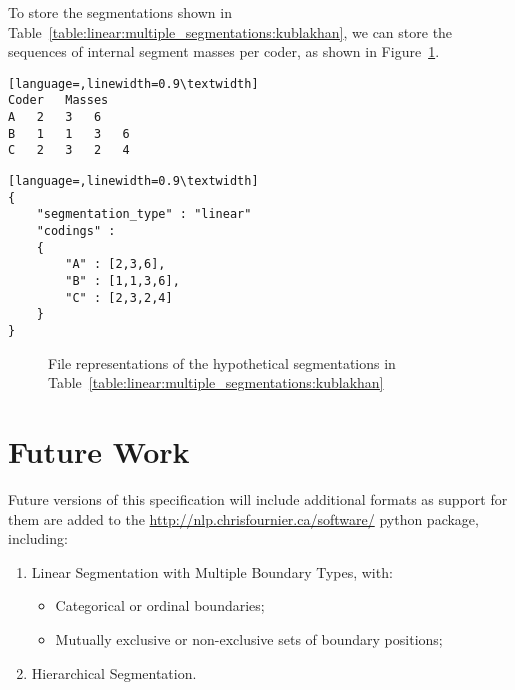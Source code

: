 \documentclass{article}
\begin{document}
To store the segmentations shown in
Table~\ref{table:linear:multiple_segmentations:kublakhan}, we can store the
sequences of internal segment masses per coder, as shown in
Figure~\ref{fig:linear:segmentation:files}.

\newsavebox{\lineartsv}
\begin{lrbox}{\lineartsv}
\begin{minipage}[b]{0.5\textwidth}
\begin{lstlisting}[language=,linewidth=0.9\textwidth]
Coder	Masses
A	2	3	6
B	1	1	3	6
C	2	3	2	4

\end{lstlisting}
\vspace{-2em}
\end{minipage}
\end{lrbox}

\newsavebox{\linearjson}
\begin{lrbox}{\linearjson}
\begin{minipage}[b]{0.5\textwidth}
\begin{lstlisting}[language=,linewidth=0.9\textwidth]
{
	"segmentation_type" : "linear"
	"codings" :
	{
		"A" : [2,3,6],
		"B" : [1,1,3,6],
		"C" : [2,3,2,4]
	}
}
\end{lstlisting}
\vspace{-2em}
\end{minipage}
\end{lrbox}

\begin{figure}[h]
\hspace{1em}
\subfloat[TSV]{\usebox{\lineartsv}}
\subfloat[JSON]{\usebox{\linearjson}}
\caption{File representations of the hypothetical segmentations in Table~\ref{table:linear:multiple_segmentations:kublakhan}}
\label{fig:linear:segmentation:files}
\end{figure}


\section{Future Work}
Future versions of this specification will include additional formats as support
for them are added to the \href{segeval}{http://nlp.chrisfournier.ca/software/}
python package, including:
\begin{enumerate}
  \setlength{\itemsep}{0cm}%
  \setlength{\parskip}{0cm}%
  \item Linear Segmentation with Multiple Boundary Types, with:
  \begin{itemize}
    \item Categorical or ordinal boundaries;
    \item Mutually exclusive or non-exclusive sets of boundary positions;
  \end{itemize}
  \item Hierarchical Segmentation.
\end{enumerate}



\end{document}
